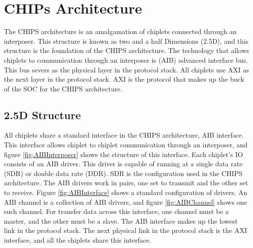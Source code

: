 \documentclass[../main.tex]{subfiles}
\begin{document}
\section{CHIPs Architecture}
The CHIPS architecture is an amalgamation of chiplets connected through an interposer. This structure is known as two and a half Dimensions (2.5D), and this structure is the foundation of the CHIPS architecture. The technology that allows chiplets to communication through an interposer is (AIB) advanced interface bus\cite{AIBWhitePaper}. This bus severs as the physical layer in the protocol stack. All chiplets use AXI as the next layer in the protocol stack. AXI is the protocol that makes up the buck of the SOC for the CHIPS architecture.

\subsection{2.5D Structure}
All chiplets share a standard interface in the CHIPS architecture, AIB interface. This interface allows chiplet to chiplet communication through an interposer, and figure \ref{fig:AIBInterposer} shows the structure of this interface. Each chiplet's IO consists of an AIB driver. This driver is capable of running at a single data rate (SDR) or double data rate (DDR). SDR is the configuration used in the CHIPS architecture. The AIB drivers work in pairs, one set to transmit and the other set to receive. Figure \ref{fig:AIBInterface} shows a standard configuration of drivers. An AIB channel is a collection of AIB drivers, and figure \ref{fig:AIBChannel} shows one such channel.  For transfer data across this interface, one channel must be a master, and the other must be a slave. The AIB interface makes up the lowest link in the protocol stack. The next physical link in the protocol stack is the AXI interface, and all the chiplets share this interface.    
\end{document}
